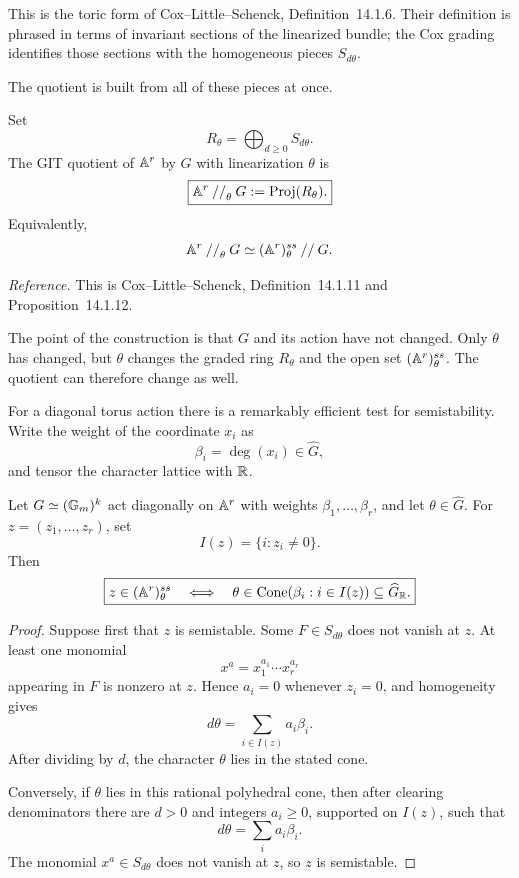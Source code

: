 This is the toric form of Cox--Little--Schenck,
Definition~14.1.6.  Their definition is phrased in terms of invariant
sections of the linearized bundle; the Cox grading identifies those
sections with the homogeneous pieces \(S_{d\theta}\).

The quotient is built from all of these pieces at once.

\begin{definition}
\label{def:toric-git-quotient}
Set
\[
R_\theta
=
\bigoplus_{d\geq0}S_{d\theta}.
\]
The GIT quotient of \(\mathbb{A}^r\) by \(G\) with linearization \(\theta\)
is
\[
\boxed{
\mathbb{A}^r\mathbin{//}_\theta G
:=
\operatorname{Proj}(R_\theta).}
\]
Equivalently,
\[
\mathbb{A}^r\mathbin{//}_\theta G
\simeq
(\mathbb{A}^r)^{ss}_\theta\mathbin{//}G.
\]
\end{definition}

\noindent
\textit{Reference.}
This is Cox--Little--Schenck, Definition~14.1.11 and
Proposition~14.1.12.

The point of the construction is that \(G\) and its action have not
changed.  Only \(\theta\) has changed, but \(\theta\) changes the graded
ring \(R_\theta\) and the open set \((\mathbb{A}^r)^{ss}_\theta\).  The
quotient can therefore change as well.

For a diagonal torus action there is a remarkably efficient test for
semistability.  Write the weight of the coordinate \(x_i\) as
\[
\beta_i=\deg(x_i)\in\widehat G,
\]
and tensor the character lattice with \(\mathbb{R}\).

\begin{proposition}
\label{prop:weight-cone-semistability}
Let \(G\simeq(\mathbb{G}_{m})^k\) act diagonally on \(\mathbb{A}^r\) with weights
\(\beta_1,\dots,\beta_r\), and let \(\theta\in\widehat G\).  For
\(z=(z_1,\dots,z_r)\), set
\[
I(z)=\{i:z_i\neq0\}.
\]
Then
\[
\boxed{
z\in(\mathbb{A}^r)^{ss}_\theta
\quad\Longleftrightarrow\quad
\theta\in
\operatorname{Cone}(\beta_i:i\in I(z))
\subseteq\widehat G_{\mathbb{R}}.}
\]
\end{proposition}

\begin{proof}
Suppose first that \(z\) is semistable.  Some
\(F\in S_{d\theta}\) does not vanish at \(z\).  At least one monomial
\[
x^a=x_1^{a_1}\cdots x_r^{a_r}
\]
appearing in \(F\) is nonzero at \(z\).  Hence \(a_i=0\) whenever
\(z_i=0\), and homogeneity gives
\[
d\theta
=
\sum_{i\in I(z)}a_i\beta_i.
\]
After dividing by \(d\), the character \(\theta\) lies in the stated
cone.

Conversely, if \(\theta\) lies in this rational polyhedral cone, then
after clearing denominators there are \(d>0\) and integers
\(a_i\geq0\), supported on \(I(z)\), such that
\[
d\theta=\sum_i a_i\beta_i.
\]
The monomial \(x^a\in S_{d\theta}\) does not vanish at \(z\), so \(z\)
is semistable.
\end{proof}

